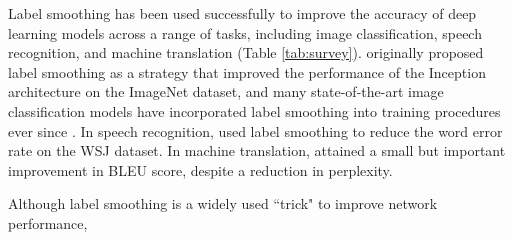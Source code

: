 \documentclass{article}
\begin{document}
Label smoothing has been used successfully to improve the accuracy of deep learning models across a range of tasks, including image classification, speech recognition, and machine translation (Table \ref{tab:survey}). \citet{szegedy2016rethinking} originally proposed label smoothing as a strategy that improved the performance of the Inception architecture on the ImageNet dataset, and many state-of-the-art image classification models have incorporated label smoothing into training procedures ever since \cite{zoph2018learning,real2018regularized,huang2018gpipe}. In speech recognition, \citet{temporal} used label smoothing to reduce the word error rate on the WSJ dataset. In machine translation, \citet{vaswani2017attention} attained a small but important improvement in BLEU score, despite a reduction in perplexity.

\begin{table}[t]
\caption{Survey of literature label smoothing results on three supervised learning tasks.}
\label{tab:survey}
\begin{center}
\begin{small}
\end{small}
\end{center}
\vskip -0.0in
\end{table}
Although label smoothing is a widely used ``trick" to improve network performance,
\end{document}
